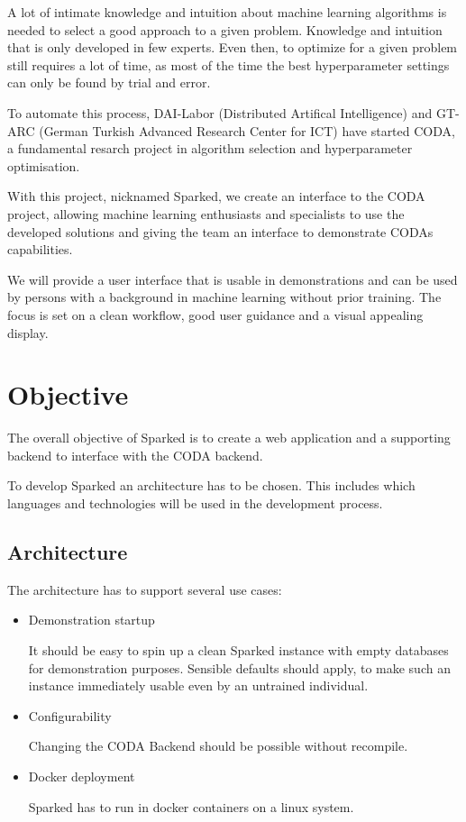 \documentclass[12pt,a4paper,titlepage,oneside,BCOR1cm]{scrreprt}
\begin{document}
A lot of intimate knowledge and intuition about machine learning algorithms is needed to select a good approach to a given problem. Knowledge and intuition that is only developed in few experts. Even then, to optimize for a given problem still requires a lot of time, as most of the time the best hyperparameter settings can only be found by trial and error.

To automate this process, DAI-Labor (Distributed Artifical Intelligence) and GT-ARC (German Turkish Advanced Research Center for ICT) have started CODA, a fundamental resarch project in algorithm selection and hyperparameter optimisation. \cite{CODA-Steckbrief}

With this project, nicknamed Sparked, we create an interface to the CODA project, allowing machine learning enthusiasts and specialists to use the developed solutions and giving the team an interface to demonstrate CODAs capabilities.

We will provide a user interface that is usable in demonstrations and can be used by persons with a background in machine learning without prior training. The focus is set on a clean workflow, good user guidance and a visual appealing display.






\chapter{Objective}
The overall objective of Sparked is to create a web application and a supporting backend to interface with the CODA backend. 

To develop Sparked an architecture has to be chosen. This includes which languages and technologies will be used in the development process. 

\section{Architecture}

The architecture has to support several use cases:
\begin{itemize}
  \item Demonstration startup
  
  It should be easy to spin up a clean Sparked instance with empty databases for demonstration purposes. Sensible defaults should apply, to make such an instance immediately usable even by an untrained individual.

  \item Configurability

  Changing the CODA Backend should be possible without recompile.

  \item Docker deployment

  Sparked has to run in docker containers on a linux system.

\end{itemize}
\end{document}

